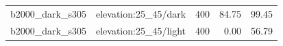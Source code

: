 \begin{longtable}{l>{\raggedright\arraybackslash}p{.42\linewidth}rrr}
b2000\_\allowbreak{}dark\_\allowbreak{}s305 & %
elevation:25\_\allowbreak{}45/dark & %
400 & %
84.75 & %
99.45 \\ %

b2000\_\allowbreak{}dark\_\allowbreak{}s305 & %
elevation:25\_\allowbreak{}45/light & %
400 & %
0.00 & %
56.79 \\ %


\end{longtable}
